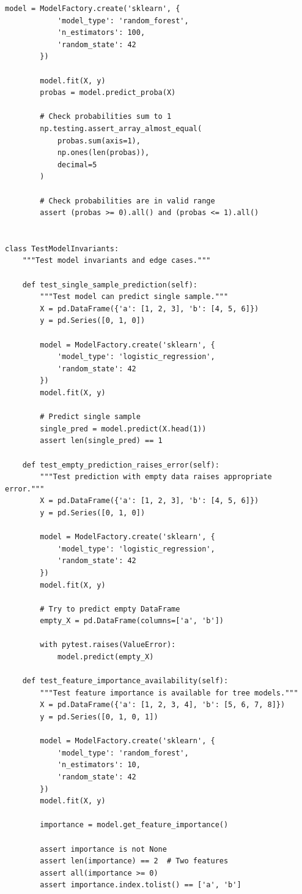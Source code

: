 \begin{lstlisting}[style=python, caption=Tests for model behavior and performance]
        model = ModelFactory.create('sklearn', {
            'model_type': 'random_forest',
            'n_estimators': 100,
            'random_state': 42
        })

        model.fit(X, y)
        probas = model.predict_proba(X)

        # Check probabilities sum to 1
        np.testing.assert_array_almost_equal(
            probas.sum(axis=1),
            np.ones(len(probas)),
            decimal=5
        )

        # Check probabilities are in valid range
        assert (probas >= 0).all() and (probas <= 1).all()


class TestModelInvariants:
    """Test model invariants and edge cases."""

    def test_single_sample_prediction(self):
        """Test model can predict single sample."""
        X = pd.DataFrame({'a': [1, 2, 3], 'b': [4, 5, 6]})
        y = pd.Series([0, 1, 0])

        model = ModelFactory.create('sklearn', {
            'model_type': 'logistic_regression',
            'random_state': 42
        })
        model.fit(X, y)

        # Predict single sample
        single_pred = model.predict(X.head(1))
        assert len(single_pred) == 1

    def test_empty_prediction_raises_error(self):
        """Test prediction with empty data raises appropriate error."""
        X = pd.DataFrame({'a': [1, 2, 3], 'b': [4, 5, 6]})
        y = pd.Series([0, 1, 0])

        model = ModelFactory.create('sklearn', {
            'model_type': 'logistic_regression',
            'random_state': 42
        })
        model.fit(X, y)

        # Try to predict empty DataFrame
        empty_X = pd.DataFrame(columns=['a', 'b'])

        with pytest.raises(ValueError):
            model.predict(empty_X)

    def test_feature_importance_availability(self):
        """Test feature importance is available for tree models."""
        X = pd.DataFrame({'a': [1, 2, 3, 4], 'b': [5, 6, 7, 8]})
        y = pd.Series([0, 1, 0, 1])

        model = ModelFactory.create('sklearn', {
            'model_type': 'random_forest',
            'n_estimators': 10,
            'random_state': 42
        })
        model.fit(X, y)

        importance = model.get_feature_importance()

        assert importance is not None
        assert len(importance) == 2  # Two features
        assert all(importance >= 0)
        assert importance.index.tolist() == ['a', 'b']
\end{lstlisting}

